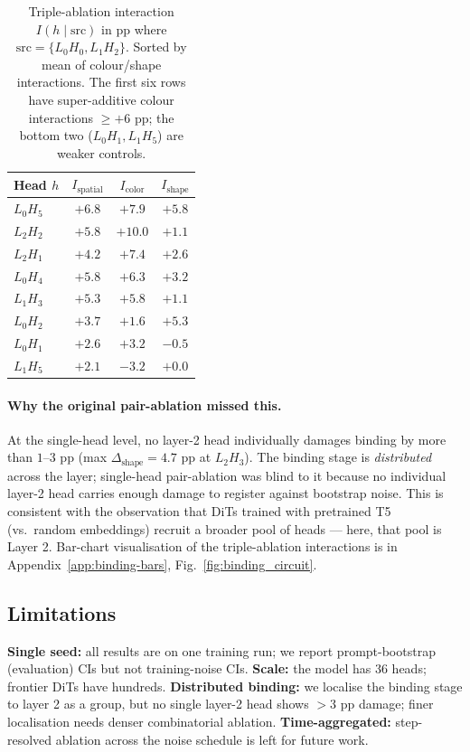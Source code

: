 \documentclass{article}
\theoremstyle{plain}
\theoremstyle{definition}
\begin{document}
\begin{table}[t]
\centering
\small
\caption{Triple-ablation interaction $I(h \mid \text{src})$ in pp where $\text{src} = \{L_0H_0, L_1H_2\}$. Sorted by mean of colour/shape interactions. The first six rows have super-additive colour interactions $\geq +6$ pp; the bottom two ($L_0H_1, L_1H_5$) are weaker controls.}
\label{tab:triple}
\begin{tabular}{lccc}
\toprule
Head $h$ & $I_\text{spatial}$ & $I_\text{color}$ & $I_\text{shape}$ \\
\midrule
$L_0H_5$ & $+6.8$ & $\mathbf{+7.9}$ & $\mathbf{+5.8}$ \\
$L_2H_2$ & $+5.8$ & $\mathbf{+10.0}$ & $+1.1$ \\
$L_2H_1$ & $+4.2$ & $\mathbf{+7.4}$ & $+2.6$ \\
$L_0H_4$ & $+5.8$ & $+6.3$ & $+3.2$ \\
$L_1H_3$ & $+5.3$ & $+5.8$ & $+1.1$ \\
$L_0H_2$ & $+3.7$ & $+1.6$ & $+5.3$ \\
$L_0H_1$ & $+2.6$ & $+3.2$ & $-0.5$ \\
$L_1H_5$ & $+2.1$ & $-3.2$ & $+0.0$ \\
\bottomrule
\end{tabular}
\end{table}

\paragraph{Why the original pair-ablation missed this.}
\label{sec:single-binding}
At the single-head level, no layer-2 head individually damages binding by more than $1$--$3$ pp (max $\Delta_\text{shape} = 4.7$ pp at $L_2H_3$). The binding stage is \emph{distributed} across the layer; single-head pair-ablation was blind to it because no individual layer-2 head carries enough damage to register against bootstrap noise. This is consistent with the \citet{wang2026circuit} observation that DiTs trained with pretrained T5 (vs.\ random embeddings) recruit a broader pool of heads --- here, that pool is Layer 2. Bar-chart visualisation of the triple-ablation interactions is in Appendix~\ref{app:binding-bars}, Fig.~\ref{fig:binding_circuit}.

\subsection{Limitations}
\label{sec:limitations}
\textbf{Single seed:} all results are on one training run; we report prompt-bootstrap (evaluation) CIs but not training-noise CIs. \textbf{Scale:} the model has 36 heads; frontier DiTs have hundreds. \textbf{Distributed binding:} we localise the binding stage to layer 2 as a group, but no single layer-2 head shows $\!>\!3$ pp damage; finer localisation needs denser combinatorial ablation. \textbf{Time-aggregated:} step-resolved ablation across the noise schedule is left for future work.
\end{document}
